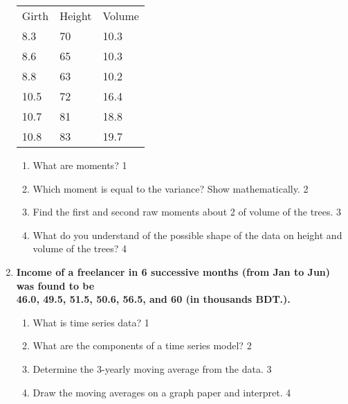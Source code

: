 \documentclass{article}
\begin{document}
\begin{enumerate}
\begin{table}[h]
 \begin{center}
\begin{tabular}{l|l|l}
\hline
Girth & Height & Volume \\
8.3   & 70     & 10.3   \\ 
8.6   & 65     & 10.3   \\ 
8.8   & 63     & 10.2   \\ 
10.5  & 72     & 16.4   \\ 
10.7  & 81     & 18.8   \\ 
10.8  & 83     & 19.7   \\  \hline
\end{tabular}
\end{center}
\end{table}
  
  \begin{enumerate}
    \item
	What are moments? \hfill 1
    \item
	Which moment is equal to the variance? Show mathematically. \hfill 2
    \item  
	Find the first and second raw moments about 2 of volume of the trees. \hfill 3
    \item
	What do you understand of the possible shape of the data on height and volume of the trees? \hfill 4
\end{enumerate}

 \item
	  \textbf{Income of a freelancer in 6 successive months (from Jan to Jun) was found to be \\ 46.0, 49.5, 51.5, 50.6, 56.5, and 60 (in thousands BDT.).}
  \begin{enumerate}
    \item
	What is time series data? \hfill 1
    \item
	What are the components of a time series model? \hfill 2
    \item  
	Determine the 3-yearly moving average from the data. \hfill 3
    \item
	Draw the moving averages on a graph paper and interpret. \hfill 4
\end{enumerate}

\end{enumerate}
\end{document}
